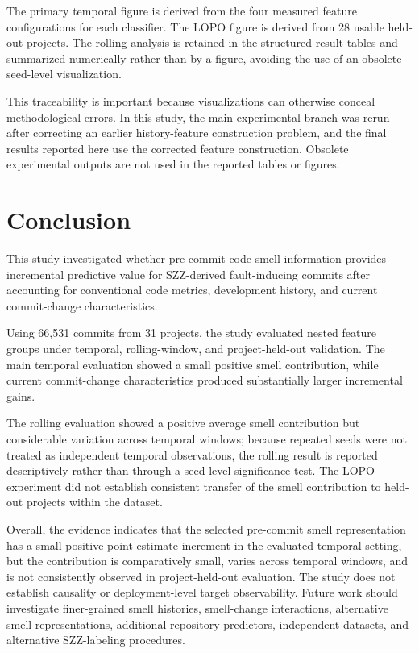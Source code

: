 \documentclass[conference]{IEEEtran}
\begin{document}
The primary temporal figure is derived from the four measured feature configurations for each classifier. The LOPO figure is derived from 28 usable held-out projects. The rolling analysis is retained in the structured result tables and summarized numerically rather than by a figure, avoiding the use of an obsolete seed-level visualization.

This traceability is important because visualizations can otherwise conceal methodological errors. In this study, the main experimental branch was rerun after correcting an earlier history-feature construction problem, and the final results reported here use the corrected feature construction. Obsolete experimental outputs are not used in the reported tables or figures.

\section{Conclusion}
This study investigated whether pre-commit code-smell information provides incremental predictive value for SZZ-derived fault-inducing commits after accounting for conventional code metrics, development history, and current commit-change characteristics.

Using 66,531 commits from 31 projects, the study evaluated nested feature groups under temporal, rolling-window, and project-held-out validation. The main temporal evaluation showed a small positive smell contribution, while current commit-change characteristics produced substantially larger incremental gains.

The rolling evaluation showed a positive average smell contribution but considerable variation across temporal windows; because repeated seeds were not treated as independent temporal observations, the rolling result is reported descriptively rather than through a seed-level significance test. The LOPO experiment did not establish consistent transfer of the smell contribution to held-out projects within the dataset.

Overall, the evidence indicates that the selected pre-commit smell representation has a small positive point-estimate increment in the evaluated temporal setting, but the contribution is comparatively small, varies across temporal windows, and is not consistently observed in project-held-out evaluation. The study does not establish causality or deployment-level target observability. Future work should investigate finer-grained smell histories, smell-change interactions, alternative smell representations, additional repository predictors, independent datasets, and alternative SZZ-labeling procedures.
\end{document}
